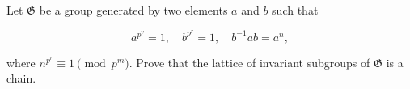 Let $\mathfrak{G}$ be a group generated by two elements $a$ and $b$ such that

$$a^{p^v} = 1, \quad b^{p^r} = 1, \quad b^{-1}ab = a^n,$$

where $n^{p^r} \equiv 1 \pmod{p^m}$. Prove that the lattice of invariant subgroups of $\mathfrak{G}$ is a chain.
